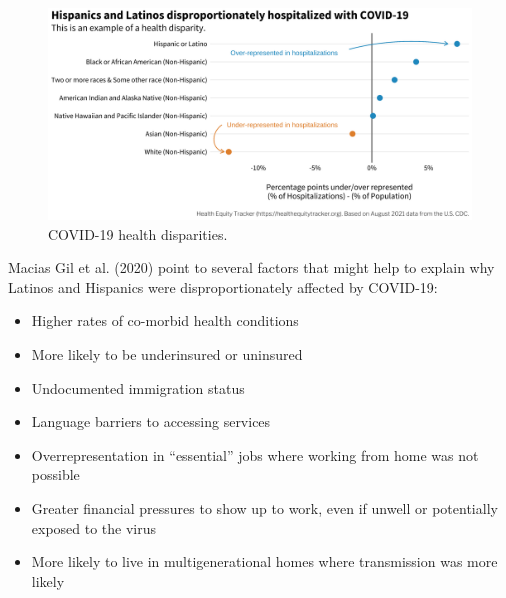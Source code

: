 \documentclass[
  letterpaper,
  DIV=11,
  numbers=noendperiod,
  oneside]{scrreprt}
\providecommand{\tightlist}{%
  \setlength{\itemsep}{0pt}\setlength{\parskip}{0pt}}\usepackage{longtable,booktabs,array}
\begin{document}
\begin{figure}[h]

{\centering \includegraphics{./images/figures/disparity.png}

}

\caption{\label{fig-disparity}COVID-19 health disparities.}

\end{figure}

Macias Gil et al.
(2020)
point to several factors that might help to explain why Latinos and
Hispanics were disproportionately affected by COVID-19:

\begin{itemize}
\tightlist
\item
  Higher rates of co-morbid health conditions
\item
  More likely to be underinsured or uninsured
\item
  Undocumented immigration status
\item
  Language barriers to accessing services
\item
  Overrepresentation in ``essential'' jobs where working from home was
  not possible
\item
  Greater financial pressures to show up to work, even if unwell or
  potentially exposed to the virus
\item
  More likely to live in multigenerational homes where transmission was
  more likely
\end{itemize}
\end{document}

